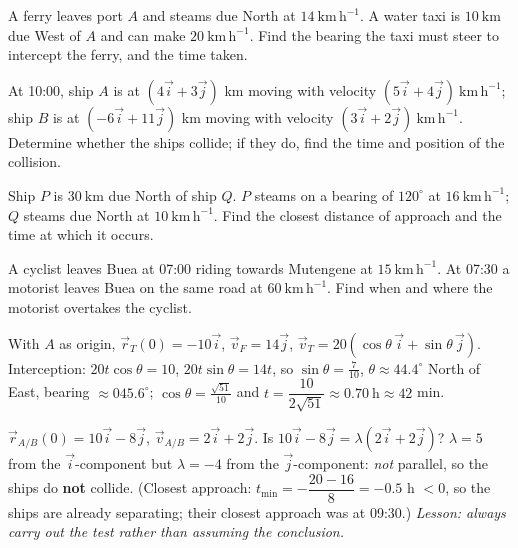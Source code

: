 \documentclass[11pt]{article}
\newcounter{popsec}
\newcounter{popsub}
\newcommand{\courssub}[1]{%
  \stepcounter{popsub}%
  \par\vspace{9pt}\noindent{\popxbold\fontsize{11.5}{13}\selectfont\color{popink}{\color{poporange}\thepopsec.\thepopsub}\hspace{6pt}#1}\par\nopagebreak\vspace{4pt}
}
\begin{document}
\courssub{Graded GCE-Style Practice}

\begin{exercice}
A ferry leaves port $A$ and steams due North at $14\ \mathrm{km\,h^{-1}}$. A water taxi is $10\ \mathrm{km}$ due West of $A$ and can make $20\ \mathrm{km\,h^{-1}}$. Find the bearing the taxi must steer to intercept the ferry, and the time taken.
\end{exercice}

\begin{exercice}
At 10:00, ship $A$ is at $(4\vec{i}+3\vec{j})$ km moving with velocity $(5\vec{i}+4\vec{j})\ \mathrm{km\,h^{-1}}$; ship $B$ is at $(-6\vec{i}+11\vec{j})$ km moving with velocity $(3\vec{i}+2\vec{j})\ \mathrm{km\,h^{-1}}$. Determine whether the ships collide; if they do, find the time and position of the collision.
\end{exercice}

\begin{exercice}
Ship $P$ is $30\ \mathrm{km}$ due North of ship $Q$. $P$ steams on a bearing of $120^{\circ}$ at $16\ \mathrm{km\,h^{-1}}$; $Q$ steams due North at $10\ \mathrm{km\,h^{-1}}$. Find the closest distance of approach and the time at which it occurs.
\end{exercice}

\begin{exercice}
A cyclist leaves Buea at 07:00 riding towards Mutengene at $15\ \mathrm{km\,h^{-1}}$. At 07:30 a motorist leaves Buea on the same road at $60\ \mathrm{km\,h^{-1}}$. Find when and where the motorist overtakes the cyclist.
\end{exercice}

\begin{corrige}[Exercise 1]
With $A$ as origin, $\vec{r}_T(0)=-10\vec{i}$, $\vec{v}_F=14\vec{j}$, $\vec{v}_T=20(\cos\theta\,\vec{i}+\sin\theta\,\vec{j})$. Interception: $20t\cos\theta=10$, $20t\sin\theta=14t$, so $\sin\theta=\tfrac{7}{10}$, $\theta\approx44.4^{\circ}$ North of East, bearing $\approx045.6^{\circ}$; $\cos\theta=\tfrac{\sqrt{51}}{10}$ and $t=\dfrac{10}{2\sqrt{51}}\approx0.70\ \mathrm{h}\approx42$ min.
\end{corrige}

\begin{corrige}[Exercise 2]
$\vec{r}_{A/B}(0)=10\vec{i}-8\vec{j}$, $\vec{v}_{A/B}=2\vec{i}+2\vec{j}$. Is $10\vec{i}-8\vec{j}=\lambda(2\vec{i}+2\vec{j})$? $\lambda=5$ from the $\vec{i}$-component but $\lambda=-4$ from the $\vec{j}$-component: \emph{not} parallel, so the ships do \textbf{not} collide. (Closest approach: $t_{\min}=-\dfrac{20-16}{8}=-0.5$ h $<0$, so the ships are already separating; their closest approach was at 09:30.) \emph{Lesson: always carry out the test rather than assuming the conclusion.}
\end{corrige}
\end{document}
